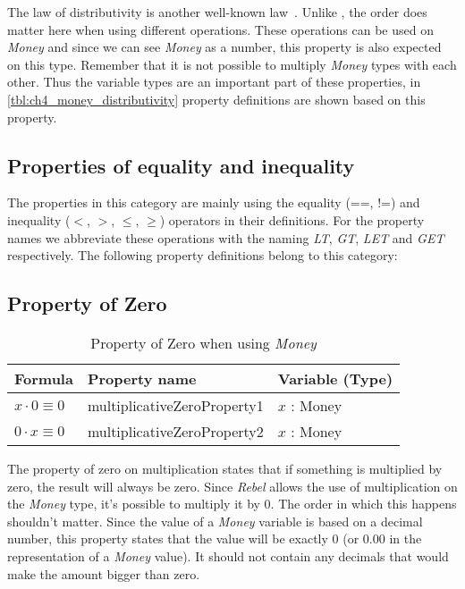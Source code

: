\FloatBarrier\noindent
The law of distributivity is another well-known law~\cite{baumgart1961axioms}.
Unlike , the order does matter here when
using different operations. These operations can be used on \textit{Money} and
since we can see \textit{Money} as a number, this property is also expected on
this type. Remember that it is not possible to multiply \textit{Money} types
with each other.
Thus the variable types are an important part of these properties, in
\autoref{tbl:ch4_money_distributivity} property definitions are shown based on
this property.

\subsection{Properties of equality and inequality}
\label{ssct:properties_definitions_equalityproperties}
The properties in this category are mainly using the equality (==, !=) and
inequality ($<$, $>$, $\leq$, $\geq$) operators in their definitions. For the
property names we abbreviate these operations with the naming \textit{LT},
\textit{GT}, \textit{LET} and \textit{GET} respectively. The following
property definitions belong to this category:

\subsection*{Property of Zero}
\label{ssct:properties_propertyofzero}
\begin{table}[!ht]
\centering
\begin{tabular}{lll}
\hline
                        \textbf{Formula}     & \textbf{Property name}      & \textbf{Variable (Type)} \\ \hline
\rowcolor[HTML]{EFEFEF} $x \cdot 0 \equiv 0$ & multiplicativeZeroProperty1 & $x$ : Money              \\
                        $0 \cdot x \equiv 0$ & multiplicativeZeroProperty2 & $x$ : Money              \\ \hline
\end{tabular}
\caption{Property of Zero when using \textit{Money}}
\label{tbl:ch4_money_propertyzero}
\end{table}
\FloatBarrier\noindent
The property of zero on multiplication states that if something is multiplied
by zero, the result will always be zero. Since \textit{Rebel} allows the use of
multiplication on the \textit{Money} type, it's possible to multiply it by 0.
The order in which this happens shouldn't matter. Since the value of a
\textit{Money} variable is based on a decimal number, this property states that
the value will be exactly 0 (or 0.00 in the representation of a \textit{Money}
value). It should not contain any decimals that would make the amount bigger
than zero.
\clearpage %
